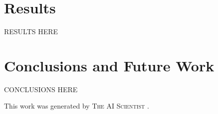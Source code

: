 \documentclass{article} %
\begin{document}
\section{Results}
\label{sec:results}
RESULTS HERE

\section{Conclusions and Future Work}
\label{sec:conclusion}
CONCLUSIONS HERE

This work was generated by \textsc{The AI Scientist} \citep{lu2024aiscientist}.



\end{document}
